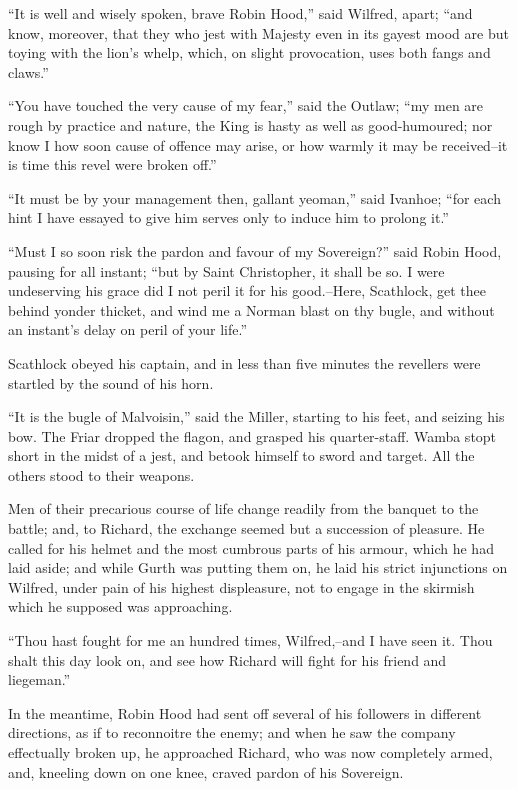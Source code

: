 ``It is well and wisely spoken, brave Robin Hood,'' said Wilfred, apart;
``and know, moreover, that they who jest with Majesty even in its gayest
mood are but toying with the lion's whelp, which, on slight provocation,
uses both fangs and claws.''

``You have touched the very cause of my fear,'' said the Outlaw; ``my
men are rough by practice and nature, the King is hasty as well as
good-humoured; nor know I how soon cause of offence may arise, or how
warmly it may be received--it is time this revel were broken off.''

``It must be by your management then, gallant yeoman,'' said Ivanhoe;
``for each hint I have essayed to give him serves only to induce him to
prolong it.''

``Must I so soon risk the pardon and favour of my Sovereign?'' said
Robin Hood, pausing for all instant; ``but by Saint Christopher, it
shall be so. I were undeserving his grace did I not peril it for his
good.--Here, Scathlock, get thee behind yonder thicket, and wind me a
Norman blast on thy bugle, and without an instant's delay on peril of
your life.''

Scathlock obeyed his captain, and in less than five minutes the
revellers were startled by the sound of his horn.

``It is the bugle of Malvoisin,'' said the Miller, starting to his feet,
and seizing his bow. The Friar dropped the flagon, and grasped his
quarter-staff. Wamba stopt short in the midst of a jest, and betook
himself to sword and target. All the others stood to their weapons.

Men of their precarious course of life change readily from the banquet
to the battle; and, to Richard, the exchange seemed but a succession of
pleasure. He called for his helmet and the most cumbrous parts of his
armour, which he had laid aside; and while Gurth was putting them on, he
laid his strict injunctions on Wilfred, under pain of his highest
displeasure, not to engage in the skirmish which he supposed was
approaching.

``Thou hast fought for me an hundred times, Wilfred,--and I have seen
it. Thou shalt this day look on, and see how Richard will fight for his
friend and liegeman.''

In the meantime, Robin Hood had sent off several of his followers in
different directions, as if to reconnoitre the enemy; and when he saw
the company effectually broken up, he approached Richard, who was now
completely armed, and, kneeling down on one knee, craved pardon of his
Sovereign.

